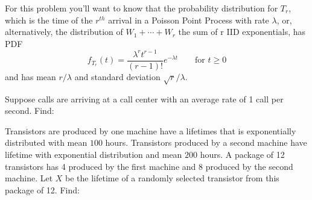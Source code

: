 \documentclass[addpoints,12pt]{exam}
\begin{document}
\begin{questions}
\addpoints

\question[3] For this problem you'll want to know that the probability distribution for $T_r$, which is the time of the $r^{th}$ arrival in a Poisson Point Process with rate $\lambda$, or, alternatively, the distribution of $W_1+\cdots + W_r$ the sum of r IID exponentials, has PDF
\[
f_{T_r}(t) = \frac{\lambda^r t^{r-1}}{(r-1)!} e^{-\lambda t} \qquad \text{for } t\geq 0 
\]
and has mean $r/\lambda$ and standard deviation $\sqrt{r}/\lambda$.

Suppose calls are arriving at a call center with an average rate of 1 call per second. Find:
 \noaddpoints
{}
\addpoints



\question[4] Transistors are produced by one machine have a lifetimes that is exponentially distributed with mean $100$ hours. Transistors produced by a second machine have lifetime with exponential distribution and mean $200$ hours. A package of 12 transistors has 4 produced by the first machine and 8 produced by the second machine. Let $X$ be the lifetime of a randomly selected transistor from this package of 12. Find:
 \noaddpoints
{}
\end{questions}
\end{document}

